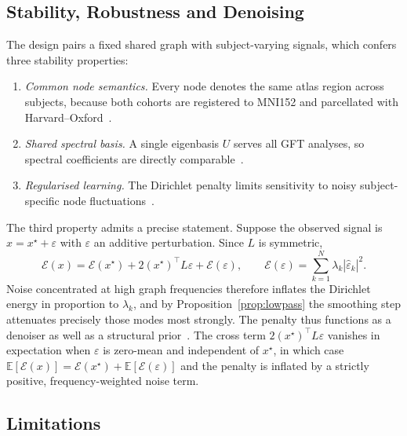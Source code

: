 \documentclass[11pt,reqno]{amsart}
\theoremstyle{plain}
\theoremstyle{definition}
\theoremstyle{remark}
\numberwithin{equation}{section}
\begin{document}
\subsection{Stability, Robustness and Denoising}

The design pairs a fixed shared graph with subject-varying signals, which confers
three stability properties:

\begin{enumerate}[label=(\arabic*),leftmargin=2.2em]
  \item \emph{Common node semantics.} Every node denotes the same atlas region
        across subjects, because both cohorts are registered to MNI152 and
        parcellated with Harvard--Oxford~\cite{fonov2011unbiased,makris2006decreased}.
  \item \emph{Shared spectral basis.} A single eigenbasis $U$ serves all GFT
        analyses, so spectral coefficients are directly
        comparable~\cite{chung1997spectral}.
  \item \emph{Regularised learning.} The Dirichlet penalty limits sensitivity to
        noisy subject-specific node fluctuations~\cite{belkin2003laplacian}.
\end{enumerate}

The third property admits a precise statement. Suppose the observed signal is
$x = x^{\star} + \varepsilon$ with $\varepsilon$ an additive perturbation. Since
$L$ is symmetric,
\begin{equation}
\label{eq:noise_decomposition}
\mathcal{E}(x)
= \mathcal{E}(x^{\star}) + 2(x^{\star})^{\top} L \varepsilon + \mathcal{E}(\varepsilon),
\qquad
\mathcal{E}(\varepsilon) = \sum_{k=1}^{N}\lambda_k |\hat\varepsilon_k|^2 .
\end{equation}
Noise concentrated at high graph frequencies therefore inflates the Dirichlet
energy in proportion to $\lambda_k$, and by Proposition~\ref{prop:lowpass} the
smoothing step attenuates precisely those modes most strongly. The penalty thus
functions as a denoiser as well as a structural prior~\cite{shuman2013emerging}.
The cross term $2(x^{\star})^{\top}L\varepsilon$ vanishes in expectation when
$\varepsilon$ is zero-mean and independent of $x^{\star}$, in which case
$\mathbb{E}[\mathcal{E}(x)] = \mathcal{E}(x^{\star}) + \mathbb{E}[\mathcal{E}(\varepsilon)]$
and the penalty is inflated by a strictly positive, frequency-weighted noise
term.

\subsection{Limitations}
\label{sec:limitations}
\end{document}
